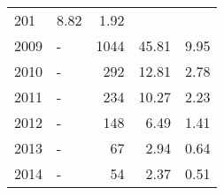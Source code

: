\begin{longtable}{lXrrr}
       \num{201} &
       \num[round-mode=places,round-precision=2]{8,82} &
         \num[round-mode=places,round-precision=2]{1,92} \\

     2009 &
     \multicolumn{1}{X}{ -  } &


       \num{1044} &
       \num[round-mode=places,round-precision=2]{45,81} &
         \num[round-mode=places,round-precision=2]{9,95} \\

     2010 &
     \multicolumn{1}{X}{ -  } &


       \num{292} &
       \num[round-mode=places,round-precision=2]{12,81} &
         \num[round-mode=places,round-precision=2]{2,78} \\

     2011 &
     \multicolumn{1}{X}{ -  } &


       \num{234} &
       \num[round-mode=places,round-precision=2]{10,27} &
         \num[round-mode=places,round-precision=2]{2,23} \\

     2012 &
     \multicolumn{1}{X}{ -  } &


       \num{148} &
       \num[round-mode=places,round-precision=2]{6,49} &
         \num[round-mode=places,round-precision=2]{1,41} \\

     2013 &
     \multicolumn{1}{X}{ -  } &


       \num{67} &
       \num[round-mode=places,round-precision=2]{2,94} &
         \num[round-mode=places,round-precision=2]{0,64} \\

     2014 &
     \multicolumn{1}{X}{ -  } &


       \num{54} &
       \num[round-mode=places,round-precision=2]{2,37} &
         \num[round-mode=places,round-precision=2]{0,51} \\


\end{longtable}
